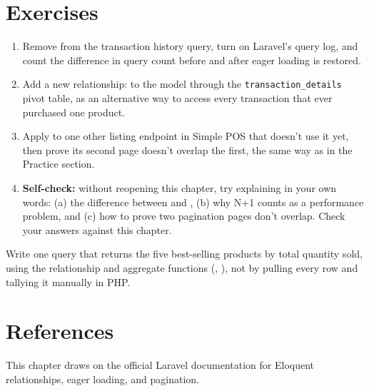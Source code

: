 \section{Exercises}

\begin{enumerate}
  \item Remove  from the transaction
    history query, turn on Laravel's query log, and count the
    difference in query count before and after eager loading is
    restored.
  \item Add a new relationship:  to
    the  model through the
    \texttt{transaction\_details} pivot table, as an alternative way to
    access every transaction that ever purchased one product.
  \item Apply  to one other listing endpoint in
    Simple POS that doesn't use it yet, then prove its second page
    doesn't overlap the first, the same way as in the Practice section.
  \item \textbf{Self-check:} without reopening this chapter, try
    explaining in your own words: (a) the difference between
     and , (b) why N+1 counts as a
    performance problem, and (c) how to prove two pagination pages
    don't overlap. Check your answers against this chapter.
\end{enumerate}

\begin{challengebox}
Write one query that returns the five best-selling products by total
quantity sold, using the  relationship and
aggregate functions (, ), not by
pulling every row and tallying it manually in PHP.
\end{challengebox}

\section{References}

This chapter draws on the official Laravel documentation
\cite{laraveldocs} for Eloquent relationships, eager loading, and
pagination.
